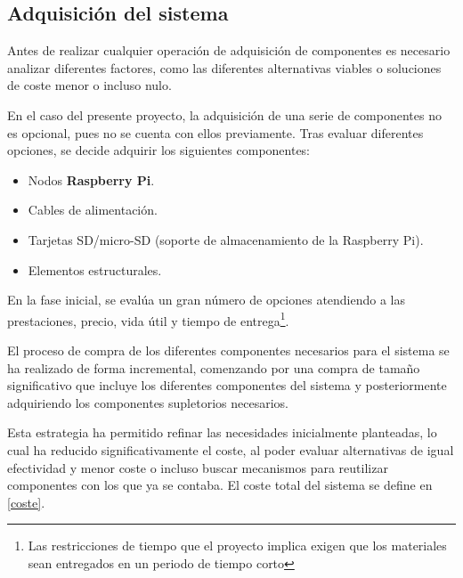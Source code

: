 
\subsection{Adquisición del sistema}
\label{adquisicion}
Antes de realizar cualquier operación de adquisición de componentes es necesario analizar diferentes factores, como las diferentes alternativas viables o soluciones de coste menor o incluso nulo.

En el caso del presente proyecto, la adquisición de una serie de componentes no es opcional, pues no se cuenta con ellos previamente. Tras evaluar diferentes opciones, se decide adquirir los siguientes componentes:

\begin{itemize}
  \item Nodos \textbf{Raspberry Pi}.
  \item Cables de alimentación.
  \item Tarjetas SD/micro-SD (soporte de almacenamiento de la Raspberry Pi).
  \item Elementos estructurales.
\end{itemize}

En la fase inicial, se evalúa un gran número de opciones atendiendo a las prestaciones, precio, vida útil y tiempo de entrega\footnote{Las restricciones de tiempo que el proyecto implica exigen que los materiales sean entregados en un periodo de tiempo corto}.

El proceso de compra de los diferentes componentes necesarios para el sistema se ha realizado de forma incremental, comenzando por una compra de tamaño significativo que incluye los diferentes componentes del sistema y posteriormente adquiriendo los componentes supletorios necesarios.

Esta estrategia ha permitido refinar las necesidades inicialmente planteadas, lo cual ha reducido significativamente el coste, al poder evaluar alternativas de igual efectividad y menor coste o incluso buscar mecanismos para reutilizar componentes con los que ya se contaba. El coste total del sistema se define en \ref{coste}.

